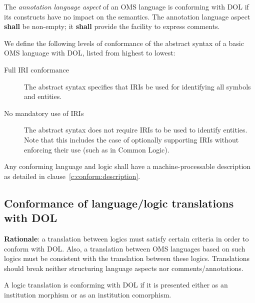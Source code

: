 \documentclass[10pt,fleqn,%
\ifpretendfinal
final%
\else
draft%
\fi,
]{scrreprt}
\newcommand*{\shall}{\textbf{shall}\xspace}
\newcommand*{\may}{\textbf{may}\xspace}
\newcommand{\clauserefname}{clause}
\newcommand{\cref}[1]{\clauserefname~\ref{#1}}
\newcommand{\ssclause}[1]{\subsection{#1}}
\begin{document}
The \emph{annotation language aspect} of an OMS language is conforming with DOL if its constructs
have no impact on the semantics. The annotation language aspect \shall be non-empty; it \shall
provide the facility to express comments.

We define the following levels of conformance of the abstract syntax of a basic
 OMS language with DOL, listed from highest to lowest:

\begin{description}
\item[Full IRI conformance] The abstract syntax specifies that IRIs be used for
 identifying all symbols and entities.
\item[No mandatory use of IRIs] The abstract syntax does not require  IRIs
 to be used to identify entities. Note that this includes the case of
  optionally supporting IRIs without enforcing their use (such as in Common
  Logic).
\end{description}

Any conforming language and logic shall have a machine-processable description
 as detailed in \cref{c:conform:description}.

\ssclause{Conformance of language/logic translations with DOL}\label{c:conform:translation}
\begin{fminipage}{\textwidth}
\textbf{Rationale}: a translation between logics must satisfy certain criteria in order to conform with DOL.
Also, a translation between OMS languages based on such logics must be consistent with the
translation between these logics.  Translations should break neither structuring language aspects nor comments/annotations.
\end{fminipage}

A logic translation is conforming with DOL if it is presented either as an institution morphism or
as an institution comorphism.  
\end{document}
